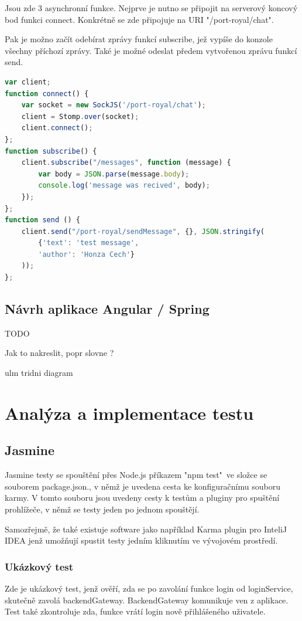 \documentclass[czech,master,public,dept460,male,cpdeclaration,twoside]{diploma}
\begin{document}
Jsou zde 3 asynchronní funkce. Nejprve je nutno se připojit na serverový koncový bod funkci connect. Konkrétně se zde připojuje na URI "/port-royal/chat". 

Pak je možno začít odebírat zprávy funkcí subscribe, jež vypíše do konzole všechny příchozí zprávy. Také je možné odeslat předem vytvořenou zprávu funkcí send.

\begin{lstlisting}[language=JavaScript, caption=Použití websocketu na straně klienta]
var client;      
function connect() {
    var socket = new SockJS('/port-royal/chat');
    client = Stomp.over(socket);
    client.connect();
};
function subscribe() {
    client.subscribe("/messages", function (message) {
        var body = JSON.parse(message.body);
        console.log('message was recived', body);
    });
};
function send () {
    client.send("/port-royal/sendMessage", {}, JSON.stringify(
        {'text': 'test message',
        'author': 'Honza Cech'}
    ));
};
\end{lstlisting}

\subsection{Návrh aplikace Angular / Spring}
TODO

Jak to nakreslit, popr slovne ?

ulm tridni diagram

\section{Analýza a implementace testu}

\subsection{Jasmine}
Jasmine testy se spouštění přes Node.js příkazem "npm test"~ve složce se souborem package.json., v němž je uvedena cesta ke konfiguračnímu souboru karmy. V tomto souboru jsou uvedeny cesty k testům a pluginy pro spuštění prohlížeče, v němž se testy jeden po jednom spouštějí. 

Samozřejmě, že také existuje software jako například Karma plugin pro InteliJ IDEA jenž umožňují spustit testy jedním kliknutím ve vývojovém prostředí.

\subsubsection{Ukázkový test}
Zde je ukázkový test, jenž ověří, zda se po zavolání funkce login od loginService, skutečně zavolá backendGateway. BackendGateway komunikuje ven z aplikace. Test také zkontroluje zda, funkce vrátí login nově přihlášeného uživatele.
  
\end{document}
